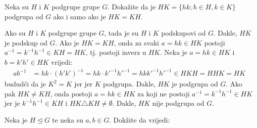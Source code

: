 \documentclass{exam}
\begin{document}
\begin{questions}

\begin{solution}
\end{solution}

\question Neka su $H$ i $K$ podgrupe grupe $G$. Dokažite da je $HK = \{hk; h \in H, k \in K\}$ podgrupa od $G$ ako i samo ako je $HK = KH$.

\begin{solution}
  Ako su $H$ i $K$ podgrupe grupe $G$, tada je su $H$ i $K$ podskupovi od $G$. Dakle, $HK$ je podskup od $G$. Ako je $HK = KH$, onda za svaki $a = hk \in HK$ postoji $a^{-1} = k^{-1}h^{-1} \in KH = HK$, tj. postoji inverz u $HK$. Neka je $a = hk \in HK$ i $b = k'h' \in HK$ vrijedi:
  \begin{align*}
    ab^{-1} &= hk \cdot (h'k')^{-1} = hk \cdot k'^{-1}h'^{-1} = hkk'^{-1}h'^{-1} \in HKH = HHK = HK
  \end{align*}
  bududći da je $K^2 = K$ jer jer $K$ podgrupa. Dakle, $HK$ je podgrupa od $G$.
  Ako pak $HK \neq KH$, onda postoji $a = hk \in HK$ za koji ne postoji $a^{-1} = k^{-1}h^{-1} \in HK$ jer je $k^{-1}h^{-1} \in KH$ i $HK \triangle KH \neq \emptyset$. Dakle, $HK$ nije podgrupa od $G$.
\end{solution}

\question Neka je $H \trianglelefteq G$ te neka su $a, b \in G$. Dokžite da vrijedi:


\end{questions}
\end{document}

